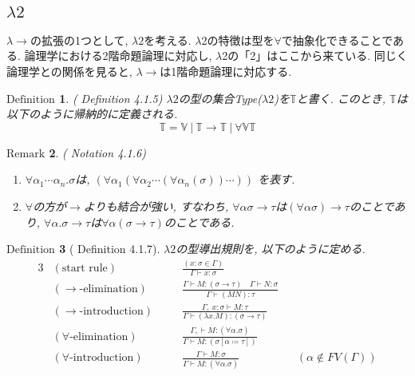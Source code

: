 \documentclass[11pt]{jsreport}
\theoremstyle{mystyle}
\newtheorem{df}{$\textrm{Definition}$}[section]
\newtheorem{rmk}[df]{$\textrm{Remark}$}
\newcommand{\T}{\mathbb{T}}
\newcommand{\V}{\mathbb{V}}
\newcommand{\lama}{\lambda \! \! \to}
\newcommand{\0}{\textbf{0}}
\begin{document}
\subsection*{$\lambda 2$}
$\lama$の拡張の1つとして, $\lambda 2$を考える. $\lambda$2の特徴は型を$\forall$で抽象化できることである. 論理学における2階命題論理に対応し, $\lambda$2の「2」はここから来ている. 同じく論理学との関係を見ると, $\lama$は1階命題論理に対応する. 
\begin{shadebox}
  \begin{df}{(\cite{Bar} Definition 4.1.5)}
    $\lambda 2$の型の集合Type($\lambda 2$)を$\T$と書く. 
    このとき, $\T$は以下のように帰納的に定義される. 
    \[
      \T = \V \ |\ \T \to \T \ |\ \forall \V \T
    \]
  \end{df}
\end{shadebox}
\begin{rmk}{(\cite{Bar} Notation 4.1.6)}
  \begin{enumerate}
    \item $\forall \alpha_1 \cdots \alpha_n . \sigma$は, 
             $(\forall \alpha_1(\forall \alpha_2 \cdots (\forall \alpha_n (\sigma))\cdots))$
             を表す. 
    \item $\forall$の方が$\to$よりも結合が強い, すなわち, 
             $\forall \alpha \sigma \to \tau$は$(\forall \alpha \sigma) \to \tau$のことであり, 
             $\forall \alpha . \sigma \to \tau$は$\forall \alpha (\sigma \to \tau)$のことである.
  \end{enumerate}
\end{rmk}
\begin{shadebox}
  \begin{df}[\cite{Bar} Definition 4.1.7]
    $\lambda 2$の型導出規則を, 以下のように定める.
    \begin{alignat*}{3}
      &(\text{start rule})& \quad &\frac{(x \colon \sigma \in \Gamma)}
        {\Gamma \vdash x \colon \sigma}& &\\
      &(\text{$\to$-elimination})& 
        &\frac{\Gamma \vdash M \colon (\sigma \to \tau) \quad
          \Gamma \vdash N \colon \sigma}{\Gamma \vdash (MN) \colon \tau}& & \\
      &(\text{$\to$-introduction})& &\frac{\Gamma,\ x \colon \sigma \vdash M \colon \tau}
        {\Gamma \vdash (\lambda x . M) \colon (\sigma \to \tau)}& & \\
      &(\text{$\forall$-elimination})& &\frac{\Gamma, \vdash M \colon (\forall \alpha . \sigma)}
        {\Gamma \vdash M \colon (\sigma[\alpha \coloneqq \tau])}& & \\
      &(\text{$\forall$-introduction})& &\frac{\Gamma \vdash M \colon \sigma}
        {\Gamma \vdash M \colon (\forall \alpha . \sigma)}& &(\alpha \notin FV(\Gamma))
    \end{alignat*}
  \end{df}
\end{shadebox}
\end{document}
